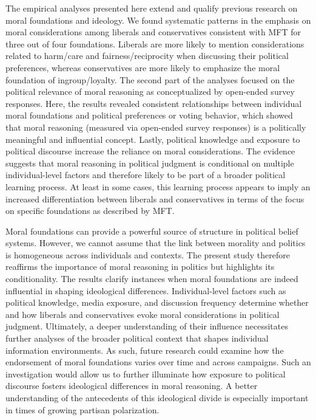 \documentclass[12pt]{article}
\begin{document}
The empirical analyses presented here extend and qualify previous research on moral foundations and ideology. We found systematic patterns in the emphasis on moral considerations among liberals and conservatives consistent with MFT for three out of four foundations. Liberals are more likely to mention considerations related to harm/care and fairness/reciprocity when discussing their political preferences, whereas conservatives are more likely to emphasize the moral foundation of ingroup/loyalty. The second part of the analyses focused on the political relevance of moral reasoning as conceptualized by open-ended survey responses. Here, the results revealed consistent relationships between individual moral foundations and political preferences or voting behavior, which showed that moral reasoning (measured via open-ended survey responses) is a politically meaningful and influential concept. Lastly, political knowledge and exposure to political discourse increase the reliance on moral considerations. The evidence suggests that moral reasoning in political judgment is conditional on multiple individual-level factors and therefore likely to be part of a broader political learning process. At least in some cases, this learning process appears to imply an increased differentiation between liberals and conservatives in terms of the focus on specific foundations as described by MFT.

Moral foundations can provide a powerful source of structure in political belief systems. However, we cannot assume that the link between morality and politics is homogeneous across individuals and contexts. The present study therefore reaffirms the importance of moral reasoning in politics but highlights its conditionality. The results clarify instances when moral foundations are indeed influential in shaping ideological differences. Individual-level factors such as political knowledge, media exposure, and discussion frequency determine whether and how liberals and conservatives evoke moral considerations in political judgment. Ultimately, a deeper understanding of their influence necessitates further analyses of the broader political context that shapes individual information environments. As such, future research could examine how the endorsement of moral foundations varies over time and across campaigns. Such an investigation would allow us to further illuminate how exposure to political discourse fosters ideological differences in moral reasoning. A better understanding of the antecedents of this ideological divide is especially important in times of growing partisan polarization.
\end{document}
